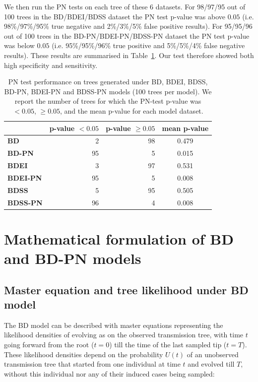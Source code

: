 \documentclass[a4paper,10pt]{article}
\begin{document}
We then run the PN tests on each tree of these 6 datasets. For 98/97/95 out of 100 trees in the BD/BDEI/BDSS dataset the PN test p-value was above $0.05$ (i.e. 98\%/97\%/95\% true negative and 2\%/3\%/5\% false positive results). For 95/95/96 out of 100 trees in the BD-PN/BDEI-PN/BDSS-PN dataset the PN test p-value was below $0.05$ (i.e. 95\%/95\%/96\% true positive and 5\%/5\%/4\% false negative results). These results are summarised in Table~\ref{tbl:pntest}. Our test therefore showed both high specificity and sensitivity.

\begin{table}[!h]\centering
\small
\caption{PN test performance on trees generated under BD, BDEI, BDSS, BD-PN, BDEI-PN and BDSS-PN models (100 trees per model). We report the number of trees for which the PN-test p-value was $<0.05$, $\geq 0.05$, and the mean p-value for each model dataset.}
\begin{tabular}{l|r|r|c}
 & \textbf{p-value $<0.05$} & \textbf{p-value $\geq0.05$} & \textbf{mean p-value} \\
  \midrule
\textbf{BD}& 2 & 98 & 0.479 \\
\textbf{BD-PN}& 95 & 5 & 0.015 \\
  \midrule
\textbf{BDEI}& 3 & 97 & 0.531 \\
\textbf{BDEI-PN}& 95 & 5 & 0.008 \\
  \midrule
\textbf{BDSS}& 5 & 95 & 0.505 \\
\textbf{BDSS-PN}& 96 & 4 & 0.008 \\
\end{tabular}
\label{tbl:pntest}
\end{table}
 

\section{Mathematical formulation of BD and BD-PN models}\label{math}


\subsection{Master equation and tree likelihood under BD model}
The BD model can be described with master equations representing the likelihood densities of evolving as on the observed transmission tree, with time $t$ going forward from the root ($t=0$) till the time of the last sampled tip ($t=T$). These likelihood densities depend on the probability $U(t)$ of an unobserved transmission tree that started from one individual at time $t$ and evolved till $T$, without this individual nor any of their induced cases being sampled: 
\end{document}
